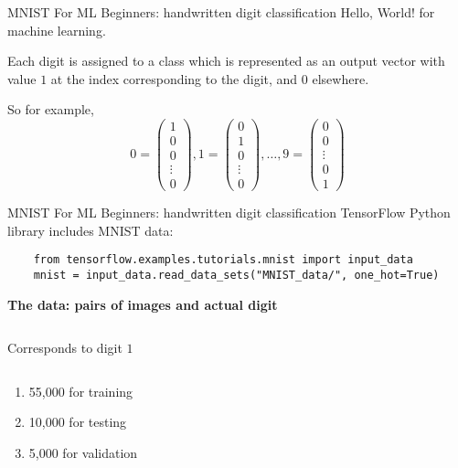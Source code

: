 \documentclass{beamer}
\begin{document}
\begin{frame}{MNIST For ML Beginners: handwritten digit classification}
    Hello, World! for machine learning.

    Each digit is assigned to a class which is represented as an output vector
    with value $1$ at the index corresponding to the digit, and $0$ elsewhere.

    So for example,
    \begin{equation}
        0 = \begin{pmatrix}1 \\ 0 \\ 0 \\ \vdots \\ 0 \end{pmatrix},
        1 = \begin{pmatrix}0 \\ 1 \\ 0 \\ \vdots \\ 0 \end{pmatrix}, \ldots,
        9 = \begin{pmatrix}0 \\ 0 \\ \vdots \\ 0 \\ 1 \end{pmatrix}
    \end{equation}
\end{frame}

\begin{frame}[fragile]{MNIST For ML Beginners: handwritten digit classification}
    TensorFlow Python library includes MNIST data:

    \begin{verbatim}
    from tensorflow.examples.tutorials.mnist import input_data
    mnist = input_data.read_data_sets("MNIST_data/", one_hot=True)
    \end{verbatim}

    \vspace{0.2in}
    \textbf{The data: pairs of images and actual digit}

        \begin{columns}[c]
            \column{2.25in}

            \column{1.15in} Corresponds to digit $1$
        \end{columns}


    \begin{enumerate}
        \item 55,000 for training
        \item 10,000 for testing
        \item 5,000 for validation
    \end{enumerate}

\end{frame}
\end{document}
